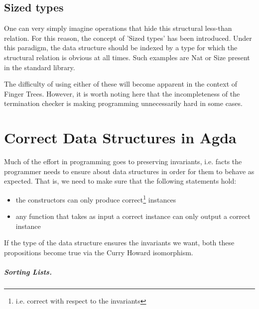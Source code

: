\documentclass[12pt,twoside,notitlepage]{report}
\begin{document}
\subsection{Sized types}

One can very simply imagine operations that hide this structural less-than relation. For this reason, the concept of 'Sized types' has been introduced. Under this paradigm, the data structure should be indexed by a type for which the structural relation is obvious at all times. Such examples are Nat or Size present in the standard library. 

The difficulty of using either of these will become apparent in the context of Finger Trees. However, it is worth noting here that the incompleteness \cite{adam_chipala}  of the termination checker is making programming unnecessarily hard in some cases. 

\section{Correct Data Structures in Agda}

Much of the effort in programming goes to preserving invariants, i.e. facts the programmer needs to ensure about data structures in order for them to behave as expected. 
That is, we need to make sure that the following statements hold:
\begin{itemize}
\item the constructors can only produce correct\footnote{i.e. correct with respect to the invariants} instances
\item any function that takes as input a correct instance can only output a correct instance
\end{itemize}

If the type of the data structure ensures the invariants we want, both these propositions become true via the Curry Howard isomorphism.

\subparagraph{Sorting Lists.}
\end{document}
